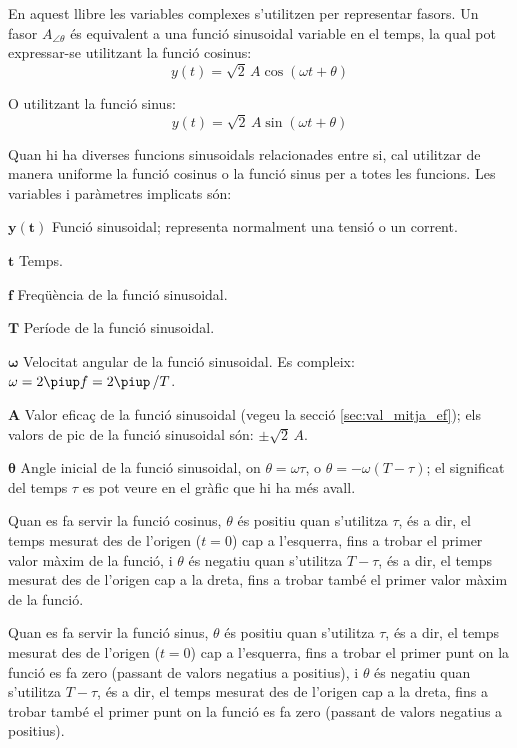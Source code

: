 \pagebreak

En aquest llibre les variables complexes s'utilitzen per representar fasors. Un fasor $A_{\angle \theta}$ és equivalent a una funció sinusoidal variable en el temps, la qual pot expressar-se utilitzant la funció cosinus:
\[y(t)=\sqrt{2}\, A \cos(\omega t + \theta)\]

O utilitzant la funció sinus:
\[y(t)=\sqrt{2}\, A \sin(\omega t + \theta)\]

Quan hi ha diverses funcions sinusoidals relacionades entre si, cal utilitzar de manera uniforme la funció cosinus o la funció sinus per a totes les funcions. Les variables i paràmetres implicats són:
\begin{list}{}
{\setlength{\labelwidth}{15mm} \setlength{\leftmargin}{20mm}
\setlength{\labelsep}{5mm}}
    \item[$\boldsymbol{y(t)}$] Funció sinusoidal; representa normalment una tensió o un corrent.
    \item[$\boldsymbol{t}$] Temps.
    \item[$\boldsymbol{f}$] Freqüència de la funció sinusoidal.
    \item[$\boldsymbol{T}$] Període de la funció sinusoidal.
    \item[$\boldsymbol{\omega}$] Velocitat angular de la funció sinusoidal. Es compleix: $\omega = 2 \piup f = 2 \piup\,/T$.
    \item[$\boldsymbol{A}$] Valor eficaç de la funció sinusoidal (vegeu la secció \vref{sec:val_mitja_ef}); els valors de pic de la funció sinusoidal  són:  $\pm\sqrt{2}\, A$.
    \item[$\boldsymbol{\theta}$] Angle inicial de la funció sinusoidal, on  $\theta=\omega \tau$, o $\theta=-\omega (T-\tau)$; el significat del temps $\tau$  es pot veure en el gràfic que hi ha més avall.

    Quan es fa servir la funció cosinus, $\theta$ és positiu quan s'utilitza $\tau$, és a dir, el temps mesurat  des de l'origen ($t=0$) cap a l'esquerra, fins a trobar el primer valor màxim de la funció, i $\theta$ és negatiu quan s'utilitza $T-\tau$, és a dir, el temps mesurat des de l'origen cap a la dreta, fins a trobar també el primer valor màxim de la funció.

    Quan es fa servir la funció sinus, $\theta$ és positiu quan s'utilitza $\tau$, és a dir, el temps mesurat des de l'origen ($t=0$) cap a l'esquerra, fins a trobar el primer punt on la funció es fa zero (passant de valors negatius a positius), i $\theta$ és negatiu quan s'utilitza $T-\tau$, és a dir, el temps mesurat des de l'origen cap a la dreta, fins a trobar també el primer punt on la funció es fa zero (passant de valors negatius a positius).
    \item[] 
\end{list}

